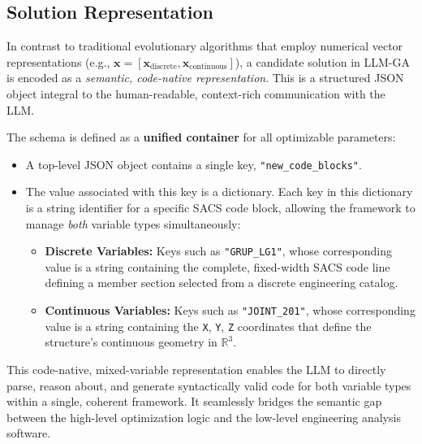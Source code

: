 \documentclass[preprint,12pt]{elsarticle}
\begin{document}
\subsection{Solution Representation}
In contrast to traditional evolutionary algorithms that employ numerical vector representations (e.g., $\mathbf{x} = [\mathbf{x}_{\text{discrete}}, \mathbf{x}_{\text{continuous}}]$), a candidate solution in LLM-GA is encoded as a \textit{semantic, code-native representation}. This is a structured JSON object integral to the human-readable, context-rich communication with the LLM.

The schema is defined as a \textbf{unified container} for all optimizable parameters:
\begin{itemize}
    \item A top-level JSON object contains a single key, \texttt{"new\_code\_blocks"}.
    \item The value associated with this key is a dictionary. Each key in this dictionary is a string identifier for a specific SACS code block, allowing the framework to manage \textit{both} variable types simultaneously:
        \begin{itemize}
            \item \textbf{Discrete Variables:} Keys such as \texttt{"GRUP\_LG1"}, whose corresponding value is a string containing the complete, fixed-width SACS code line defining a member section selected from a discrete engineering catalog.
            \item \textbf{Continuous Variables:} Keys such as \texttt{"JOINT\_201"}, whose corresponding value is a string containing the \texttt{X}, \texttt{Y}, \texttt{Z} coordinates that define the structure's continuous geometry in $\mathbb{R}^3$.
        \end{itemize}
\end{itemize}
This code-native, mixed-variable representation enables the LLM to directly parse, reason about, and generate syntactically valid code for both variable types within a single, coherent framework. It seamlessly bridges the semantic gap between the high-level optimization logic and the low-level engineering analysis software.
\end{document}
